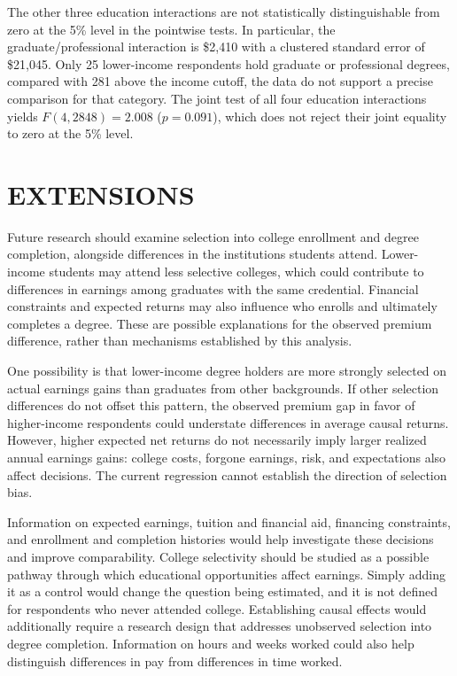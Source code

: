\documentclass[12pt,letterpaper]{article}
\begin{document}
The other three education interactions are not statistically distinguishable from
zero at the 5\% level in the pointwise tests. In particular, the graduate/professional
interaction is \$2,410 with a clustered standard error of \$21,045. Only 25
lower-income respondents hold graduate or professional degrees, compared with
281 above the income cutoff, the data do not support a precise comparison for
that category. The joint test of all four education interactions yields
$F(4,2848)=2.008$ ($p=0.091$), which does not reject their joint equality to zero
at the 5\% level.\newline

\section*{EXTENSIONS}
Future research should examine selection into college enrollment and degree completion,
alongside differences in the institutions students attend. Lower-income students may
attend less selective colleges, which could contribute to differences in earnings among
graduates with the same credential. Financial constraints and expected returns may also
influence who enrolls and ultimately completes a degree. These are possible explanations
for the observed premium difference, rather than mechanisms established by this analysis.\newline

One possibility is that lower-income degree holders are more strongly selected on actual
earnings gains than graduates from other backgrounds. If other selection differences do
not offset this pattern, the observed premium gap in favor of higher-income respondents
could understate differences in average causal returns. However, higher expected net
returns do not necessarily imply larger realized annual earnings gains: college costs,
forgone earnings, risk, and expectations also affect decisions. The current regression
cannot establish the direction of selection bias.\newline

Information on expected earnings, tuition and financial aid, financing constraints, and
enrollment and completion histories would help investigate these decisions and improve
comparability. College selectivity should be studied as a possible pathway through which
educational opportunities affect earnings. Simply adding it as a control would change the
question being estimated, and it is not defined for respondents who never attended college.
Establishing causal effects would additionally require a research design that addresses
unobserved selection into degree completion. Information on hours and weeks worked could
also help distinguish differences in pay from differences in time worked.
\end{document}
